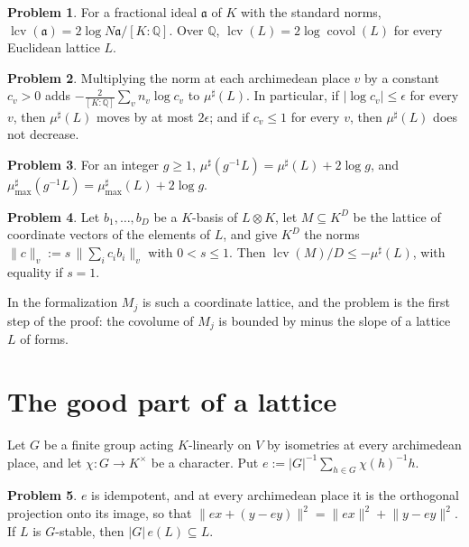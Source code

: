 \documentclass[reqno]{amsart}
\theoremstyle{definition}
\newtheorem{problem}{Problem}[section]
\theoremstyle{plain}
\theoremstyle{remark}
\newcommand{\Q}{\mathbb Q}
\newcommand{\aaa}{\mathfrak a}
\newcommand{\lcv}{\operatorname{lcv}}
\newcommand{\covol}{\operatorname{covol}}
\newcommand{\mus}{\mu^\sharp}
\newcommand{\musmax}{\mu^\sharp_{\max}}
\begin{document}
\begin{problem}\label{pr:lcv-ideal}
For a fractional ideal \(\aaa\) of \(K\) with the standard norms, \(\lcv(\aaa) = 2\log N\aaa/[K:\Q]\).  Over \(\Q\), \(\lcv(L) = 2\log\covol(L)\) for every Euclidean lattice \(L\).
\end{problem}

\begin{problem}\label{pr:rescale}
Multiplying the norm at each archimedean place \(v\) by a constant \(c_v > 0\) adds \(-\frac{2}{[K:\Q]}\sum_v n_v\log c_v\) to \(\mus(L)\).  In particular, if \(\lvert\log c_v\rvert \le \epsilon\) for every \(v\), then \(\mus(L)\) moves by at most \(2\epsilon\); and if \(c_v \le 1\) for every \(v\), then \(\mus(L)\) does not decrease.
\end{problem}

\begin{problem}\label{pr:dilate}
For an integer \(g \ge 1\), \(\mus(g^{-1}L) = \mus(L) + 2\log g\), and \(\musmax(g^{-1}L) = \musmax(L) + 2\log g\).
\end{problem}

\begin{problem}\label{pr:coordinates}
Let \(b_1, \dots, b_D\) be a \(K\)-basis of \(L \otimes K\), let \(M \subseteq K^D\) be the lattice of coordinate vectors of the elements of \(L\), and give \(K^D\) the norms \(\lVert c \rVert_v := s\,\lVert \sum_i c_i b_i \rVert_v\) with \(0 < s \le 1\).  Then \(\lcv(M)/D \le -\mus(L)\), with equality if \(s = 1\).
\end{problem}

In the formalization \(M_j\) is such a coordinate lattice, and the problem is the first step of the proof: the covolume of \(M_j\) is bounded by minus the slope of a lattice \(L\) of forms.

\section{The good part of a lattice}\label{sec:good}

Let \(G\) be a finite group acting \(K\)-linearly on \(V\) by isometries at every archimedean place, and let \(\chi \colon G \to K^\times\) be a character.  Put \(e := \lvert G\rvert^{-1}\sum_{h \in G}\chi(h)^{-1}h\).

\begin{problem}\label{pr:idempotent}
\(e\) is idempotent, and at every archimedean place it is the orthogonal projection onto its image, so that \(\lVert ex + (y - ey) \rVert^2 = \lVert ex \rVert^2 + \lVert y - ey \rVert^2\).  If \(L\) is \(G\)-stable, then \(\lvert G\rvert\,e(L) \subseteq L\).
\end{problem}
\end{document}
